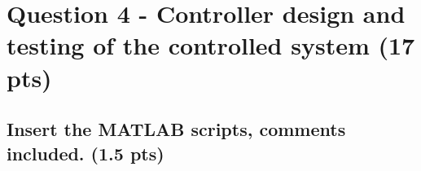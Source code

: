 \section{Question 4 - Controller design and testing of the controlled system (17 pts)}
\label{sec:q4}

\subsection{Insert the MATLAB scripts, comments included. (1.5 pts)}
\vspace{10pt}

